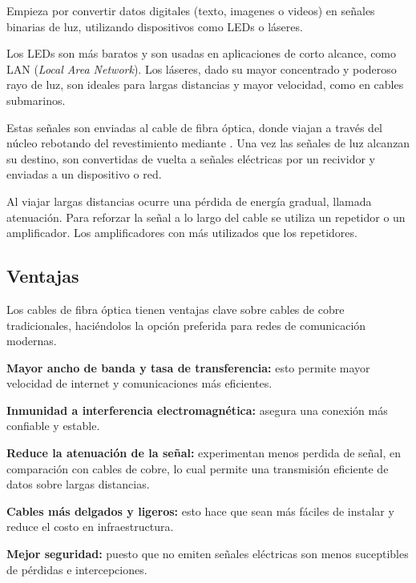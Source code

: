 Empieza por convertir datos digitales (texto, imagenes o videos) en señales binarias de luz, utilizando dispositivos como LEDs o láseres.

Los LEDs son más baratos y son usadas en aplicaciones de corto alcance, como LAN (\textit{Local Area Network}). Los láseres, dado su mayor concentrado y poderoso rayo de luz, son ideales para largas distancias y mayor velocidad, como en cables submarinos.

Estas señales son enviadas al cable de fibra óptica, donde viajan a través del núcleo rebotando del revestimiento mediante . Una vez las señales de luz alcanzan su destino, son convertidas de vuelta a señales eléctricas por un recividor y enviadas a un dispositivo o red.

Al viajar largas distancias ocurre una pérdida de energía gradual, llamada atenuación. Para reforzar la señal a lo largo del cable se utiliza un repetidor o un amplificador. Los amplificadores con más utilizados que los repetidores\cite{vnfoc}.

\subsection{Ventajas}

Los cables de fibra óptica tienen ventajas clave sobre cables de cobre tradicionales, haciéndolos la opción preferida para redes de comunicación modernas.

\textbf{Mayor ancho de banda y tasa de transferencia:} esto permite mayor velocidad de internet y comunicaciones más eficientes.

\textbf{Inmunidad a interferencia electromagnética:} asegura una conexión más confiable y estable.

\textbf{Reduce la atenuación de la señal:} experimentan menos perdida de señal, en comparación con cables de cobre, lo cual permite una transmisión eficiente de datos sobre largas distancias.

\textbf{Cables más delgados y ligeros:} esto hace que sean más fáciles de instalar y reduce el costo en infraestructura.

\textbf{Mejor seguridad:} puesto que no emiten señales eléctricas son menos suceptibles de pérdidas e intercepciones.
